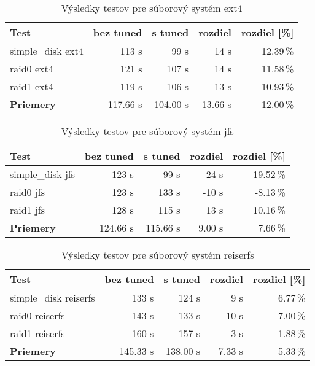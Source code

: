 \begin{table}[H]
\begin{center}
\begin{tabular}{|l|r|r|r|r|}
    \hline
    \textbf{Test} & \textbf{bez tuned} & \textbf{s tuned} & \textbf{rozdiel} & \textbf{rozdiel [\%]} \\ \hline
    simple\_disk ext4 & 113 s & 99 s & 14 s & 12.39\,\% \\
    \hline
    raid0 ext4 & 121 s & 107 s & 14 s & 11.58\,\% \\
    \hline
    raid1 ext4 & 119 s & 106 s & 13 s & 10.93\,\% \\
    \hline
    \textbf{Priemery} & 117.66 s & 104.00 s & 13.66 s & 12.00\,\% \\
    \hline
\end{tabular}
\caption{Výsledky testov pre súborový systém ext4}
\label{tab:results-ext4}
\end{center}
\end{table}

\begin{table}[H]
\begin{center}
\begin{tabular}{|l|r|r|r|r|}
    \hline
    \textbf{Test} & \textbf{bez tuned} & \textbf{s tuned} & \textbf{rozdiel} & \textbf{rozdiel [\%]} \\ \hline
    simple\_disk jfs & 123 s & 99 s & 24 s & 19.52\,\% \\
    \hline
    raid0 jfs & 123 s & 133 s & -10 s & -8.13\,\% \\
    \hline
    raid1 jfs & 128 s & 115 s & 13 s & 10.16\,\% \\
    \hline
    \textbf{Priemery} & 124.66 s & 115.66 s & 9.00 s & 7.66\,\% \\
    \hline
\end{tabular}
\caption{Výsledky testov pre súborový systém jfs}
\label{tab:results-jfs}
\end{center}
\end{table}

\begin{table}[H]
\begin{center}
\begin{tabular}{|l|r|r|r|r|}
    \hline
    \textbf{Test} & \textbf{bez tuned} & \textbf{s tuned} & \textbf{rozdiel} & \textbf{rozdiel [\%]} \\ \hline
    simple\_disk reiserfs & 133 s & 124 s & 9 s & 6.77\,\% \\
    \hline
    raid0 reiserfs & 143 s & 133 s & 10 s & 7.00\,\% \\
    \hline
    raid1 reiserfs & 160 s & 157 s & 3 s & 1.88\,\% \\
    \hline
    \textbf{Priemery} & 145.33 s & 138.00 s & 7.33 s & 5.33\,\% \\
    \hline
\end{tabular}
\caption{Výsledky testov pre súborový systém reiserfs}
\label{tab:results-reiserfs}
\end{center}
\end{table}

